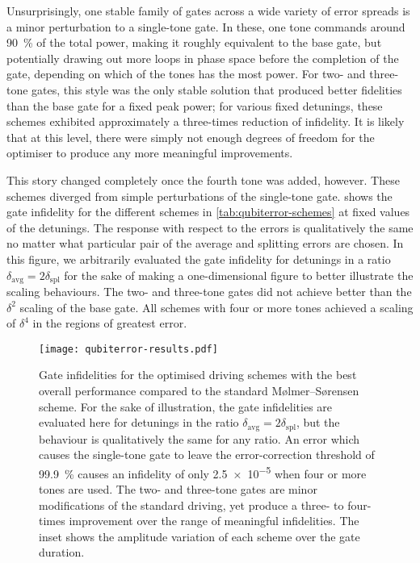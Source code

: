 Unsurprisingly, one stable family of gates across a wide variety of error spreads is a minor perturbation to a single-tone gate.
In these, one tone commands around \qty{90}{\percent} of the total power, making it roughly equivalent to the base gate, but potentially drawing out more loops in phase space before the completion of the gate, depending on which of the tones has the most power.
For two- and three-tone gates, this style was the only stable solution that produced better fidelities than the base gate for a fixed peak power; for various fixed detunings, these schemes exhibited approximately a three-times reduction of infidelity.
It is likely that at this level, there were simply not enough degrees of freedom for the optimiser to produce any more meaningful improvements.

This story changed completely once the fourth tone was added, however.
These schemes diverged from simple perturbations of the single-tone gate.
 shows the gate infidelity for the different schemes in \cref{tab:qubiterror-schemes} at fixed values of the detunings.
The response with respect to the errors is qualitatively the same no matter what particular pair of the average and splitting errors are chosen.
In this figure, we arbitrarily evaluated the gate infidelity for detunings in a ratio $\delta_{\text{avg}} = 2\delta_{\text{spl}}$ for the sake of making a one-dimensional figure to better illustrate the scaling behaviours.
The two- and three-tone gates did not achieve better than the $\delta^2$ scaling of the base gate.
All schemes with four or more tones achieved a scaling of $\delta^4$ in the regions of greatest error.

\begin{figure}%
    \texttt{[image: qubiterror-results.pdf]}%
    \caption[Fidelity properties of the robust multi-tone M\o lmer--S\o rensen gate]{\label{fig:qubiterror-multitone}%
        Gate infidelities for the optimised driving schemes with the best overall performance compared to the standard M\o lmer--S\o rensen scheme.
        For the sake of illustration, the gate infidelities are evaluated here for detunings in the ratio
$\delta_{\text{avg}} = 2\delta_{\text{spl}}$, but the behaviour is qualitatively the same for any ratio.
        An error which causes the single-tone gate to leave the error-correction threshold of \qty{99.9}{\percent} causes an infidelity of only \num{2.5e-5} when four or more tones are used.
        The two- and three-tone gates are minor modifications of the standard driving, yet produce a three- to four-times improvement over the range of meaningful infidelities.
        The inset shows the amplitude variation of each scheme over the gate duration.
    }%
\end{figure}

